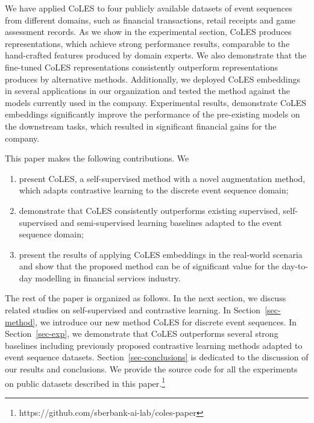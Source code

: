\documentclass[sigconf]{acmart}
\begin{document}
We have applied CoLES to four publicly available datasets of event sequences from different
domains, such as financial transactions, retail receipts and game assessment records. As we
show in the experimental section, CoLES produces representations, which achieve strong
performance results, comparable to the hand-crafted features produced by domain experts.
We also demonstrate that the fine-tuned CoLES representations consistently outperform
representations produces by alternative methods.
%
%
Additionally, we deployed CoLES embeddings in several applications in our organization and tested
the method against the models currently used in the company. Experimental results, demonstrate
CoLES embeddings significantly improve the performance of the pre-existing models on the downstream
tasks, which resulted in significant financial gains for the company.

This paper makes the following contributions. We
\begin{enumerate}
    \item present CoLES, a self-supervised method with a novel augmentation method, which adapts
    contrastive learning to the discrete event sequence domain;

    \item demonstrate that CoLES consistently outperforms existing supervised, self-supervised and
    semi-supervised learning baselines adapted to the event sequence domain;

    \item present the results of applying CoLES embeddings in the real-world scenaria and show
    that the proposed method can be of significant value for the day-to-day modelling in financial
    services industry.
\end{enumerate}

The rest of the paper is organized as follows. In the next section, we discuss related studies
on self-supervised and contrastive learning. In Section~\ref{sec-method}, we introduce our new
method CoLES for discrete event sequences. In Section~\ref{sec-exp}, we demonstrate that CoLES
outperforms several strong baselines including previously proposed contrastive learning methods
adapted to event sequence datasets. Section~\ref{sec-conclusions} is dedicated to the discussion
of our results and conclusions.
% 
We provide the source code for all the experiments on public datasets described in this paper.\footnote{https://github.com/sberbank-ai-lab/coles-paper}
\end{document}
